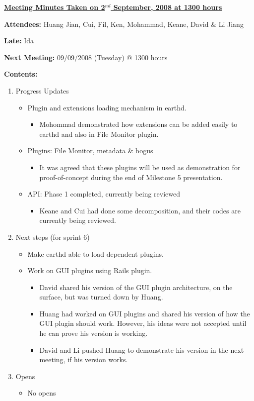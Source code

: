 \documentclass{letter}
\begin{document}
{\large \textbf{\underline{Meeting Minutes Taken on 2$^{nd}$ September, 2008 at 1300 hours}}}

\textbf{Attendees:} Huang Jian, Cui, Fil, Ken, Mohammad, Keane, David \& Li Jiang 

\textbf{Late:} Ida

\textbf{Next Meeting:} 09/09/2008 (Tuesday) @ 1300 hours 

\textbf{Contents:}

\begin{enumerate}
\item Progress Updates
	\begin{itemize}
		\item Plugin and extensions loading mechanism in earthd.
			\begin{itemize}
				\item Mohommad demonstrated how extensions can be added easily to earthd and also in File Monitor plugin.
			\end{itemize}
		\item Plugins: File Monitor, metadata \& bogus
			\begin{itemize}
				\item It was agreed that these plugins will be used as demonstration for proof-of-concept during the end of Milestone 5 presentation.
			\end{itemize}
		\item API: Phase 1 completed, currently being reviewed
			\begin{itemize}
				\item Keane and Cui had done some decomposition, and their codes are currently being reviewed. 
			\end{itemize}
	\end{itemize}
\item Next steps (for sprint 6)
	\begin{itemize}
		\item Make earthd able to load dependent plugins.
		 \item Work on GUI plugins using Rails plugin.
		 	\begin{itemize}
				\item David shared his version of the GUI plugin architecture, on the surface, but was turned down by Huang. 
				\item Huang had worked on GUI plugins and shared his version of how the GUI plugin should work. However, his ideas were not accepted until he can prove his version is working. 
				\item David and Li pushed Huang to demonstrate his version in the next meeting, if his version works. 
			\end{itemize}
	\end{itemize}
\item Opens
	\begin{itemize}
		\item No opens
	\end{itemize}
\end{enumerate} 
\end{document}
